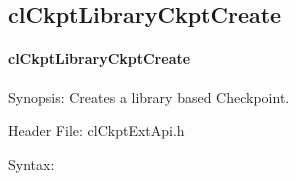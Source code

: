 \begin{flushleft}
\subsection{clCkptLibraryCkptCreate}
\hypertarget{pageckpt203}{}\paragraph{cl\-Ckpt\-Library\-Ckpt\-Create}\label{pageckpt203}
\begin{Desc}
\item[Synopsis:]Creates a library based Checkpoint.\end{Desc}
\begin{Desc}
\item[Header File:]clCkptExtApi.h\end{Desc}
\begin{Desc}
\item[Syntax:]


\end{Desc}
\end{flushleft}
